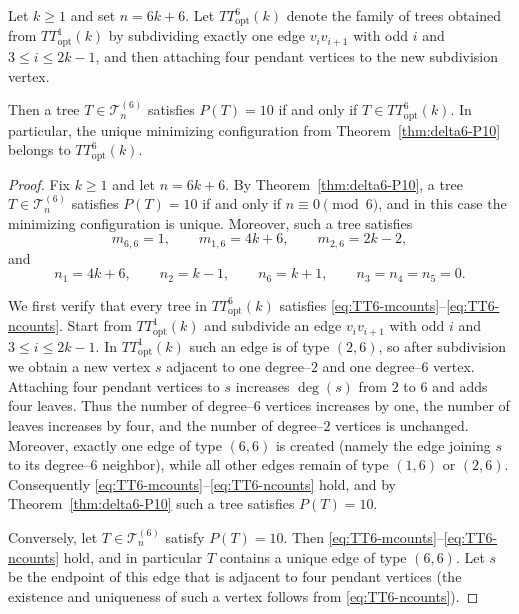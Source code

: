 \documentclass[preprint,12pt]{elsarticle}
\begin{document}
\begin{lemma}
\label{lem:TT6opt-delta6}
Let $k\ge 1$ and set $n=6k+6$.
Let $TT^6_{\mathrm{opt}}(k)$ denote the family of trees obtained from
$TT^1_{\mathrm{opt}}(k)$ by subdividing exactly one edge $v_iv_{i+1}$ with odd
$i$ and $3\le i\le 2k-1$, and then attaching four pendant vertices to the new
subdivision vertex.

Then a tree $T\in\mathcal{T}^{(6)}_n$ satisfies $P(T)=10$
if and only if $T\in TT^6_{\mathrm{opt}}(k)$.
In particular, the unique minimizing configuration from
Theorem~\ref{thm:delta6-P10} belongs to $TT^6_{\mathrm{opt}}(k)$.
\end{lemma}

\begin{proof}
Fix $k\ge 1$ and let $n=6k+6$.
By Theorem~\ref{thm:delta6-P10}, a tree $T\in\mathcal{T}^{(6)}_n$ satisfies
$P(T)=10$ if and only if $n\equiv 0\pmod 6$, and in this case the minimizing
configuration is unique.
Moreover, such a tree satisfies
\begin{equation}
m_{6,6}=1,\qquad
m_{1,6}=4k+6,\qquad
m_{2,6}=2k-2,
\label{eq:TT6-mcounts}
\end{equation}
and
\begin{equation}
n_1=4k+6,\qquad
n_2=k-1,\qquad
n_6=k+1,\qquad
n_3=n_4=n_5=0.
\label{eq:TT6-ncounts}
\end{equation}

\medskip


We first verify that every tree in $TT^6_{\mathrm{opt}}(k)$ satisfies
\eqref{eq:TT6-mcounts}--\eqref{eq:TT6-ncounts}.
Start from $TT^1_{\mathrm{opt}}(k)$ and subdivide an edge $v_iv_{i+1}$ with odd
$i$ and $3\le i\le 2k-1$.
In $TT^1_{\mathrm{opt}}(k)$ such an edge is of type $(2,6)$, so after subdivision
we obtain a new vertex $s$ adjacent to one degree--$2$ and one degree--$6$ vertex.
Attaching four pendant vertices to $s$ increases $\deg(s)$ from $2$ to $6$ and adds
four leaves.
Thus the number of degree--$6$ vertices increases by one, the number of leaves
increases by four, and the number of degree--$2$ vertices is unchanged.
Moreover, exactly one edge of type $(6,6)$ is created (namely the edge joining $s$
to its degree--$6$ neighbor), while all other edges remain of type $(1,6)$ or $(2,6)$.
Consequently \eqref{eq:TT6-mcounts}--\eqref{eq:TT6-ncounts} hold, and by
Theorem~\ref{thm:delta6-P10} such a tree satisfies $P(T)=10$.

\medskip


Conversely, let $T\in\mathcal{T}^{(6)}_n$ satisfy $P(T)=10$.
Then \eqref{eq:TT6-mcounts}--\eqref{eq:TT6-ncounts} hold, and in particular $T$
contains a unique edge of type $(6,6)$.
Let $s$ be the endpoint of this edge that is adjacent to four pendant vertices
(the existence and uniqueness of such a vertex follows from \eqref{eq:TT6-ncounts}).


\end{proof}
\end{document}
